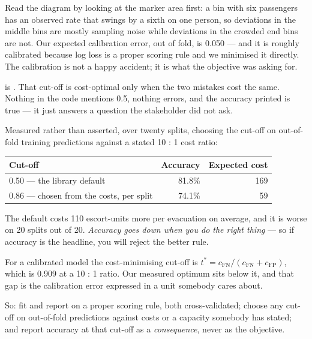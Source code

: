 \documentclass[11pt,a4paper]{article}
\begin{document}
Read the diagram by looking at the marker area first: a bin with six passengers
has an observed rate that swings by a sixth on one person, so deviations in the
middle bins are mostly sampling noise while deviations in the crowded end bins
are not. Our expected calibration error, out of fold, is 0.050 --- and it is
roughly calibrated because log loss is a proper scoring rule and we minimised
it directly. The calibration is not a happy accident; it is what the objective
was asking for.

\begin{failbox}[title={Failure condition --- a bare label hides a decision nobody made}]
 is . That cut-off is
cost-optimal only when the two mistakes cost the same. Nothing in the code
mentions 0.5, nothing errors, and the accuracy printed is true --- it just
answers a question the stakeholder did not ask.
\end{failbox}

Measured rather than asserted, over twenty splits, choosing the cut-off on
out-of-fold training predictions against a stated 10 : 1 cost ratio:

\begin{center}
\small
\begin{tabular}{lrr}
\toprule
\textbf{Cut-off} & \textbf{Accuracy} & \textbf{Expected cost} \\
\midrule
0.50 --- the library default & 81.8\% & 169 \\
0.86 --- chosen from the costs, per split & 74.1\% & 59 \\
\bottomrule
\end{tabular}
\end{center}

The default costs 110 escort-units more per evacuation on average, and it is
worse on 20 splits out of 20. \emph{Accuracy goes down when you do the right
thing} --- so if accuracy is the headline, you will reject the better rule.

For a calibrated model the cost-minimising cut-off is
$t^{\ast} = c_{\text{FN}}/(c_{\text{FN}} + c_{\text{FP}})$, which is 0.909 at a
10 : 1 ratio. Our measured optimum sits below it, and that gap is the
calibration error expressed in a unit somebody cares about.

So: fit and report on a proper scoring rule, both cross-validated; choose any
cut-off on out-of-fold predictions against costs or a capacity somebody has
stated; and report accuracy at that cut-off as a \emph{consequence}, never as
the objective.
\end{document}
